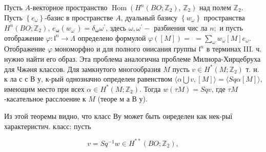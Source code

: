 \documentclass[10pt]{article}
\begin{document}
Пусть $A$-векторное пространство $\operatorname{Hom}\left(H^{n}\left(B O ; \mathbb{Z}_{2}\right)\right.$, $\left.\mathbb{Z}_{2}\right)$ над полем $\mathbb{Z}_{2}$. Пусть $\left\{e_{\omega}\right\}$-базис в пространстве $A$, дуальный базису $\left\{w_{\omega}\right\}$ пространства $H^{n}\left(B O ; \mathbb{Z}_{2}\right)$, $e_{\boldsymbol{\omega}}\left(w_{\omega^{\prime}}\right)=\delta_{\boldsymbol{\omega}} \omega^{\prime}$, здесь $\omega, \omega^{\prime}-$ разбиения чис ла $n ;$ и пусть отображение $\varphi: \mathfrak{l}^{n} \longrightarrow \Lambda$ определено формулой $\varphi([M])=$ $=\sum_{\omega} w_{\omega}[M] e_{\omega}$. Отображение $\varphi$ мономорфно и для полного оиисания группы $\mathfrak{l}^{n}$ в терминах III. ч. нужно найти его образ. Эта проблема аналогична проблеме Милнора-Хирцебруха для Чжәня классов. Для замкнутого многообразия $M$ пусть $v \in H^{*}\left(M ; \mathbb{Z}_{2}\right)$ т. н. к ла с с В у, к-рый однозначно определен равенством $\langle\alpha \bigcup v,[M]\rangle=\langle S q \alpha[M]\rangle$, имеющим место при всех $\alpha \in H^{*}\left(M ; \mathbb{Z}_{2}\right)$. Тогда $w(\tau M)=S q v$, где $\tau M$-касательное расслоение к $M$ (теоре м а В у).



Из этой теоремы видно, что класс Ву может быть оиределен как нек-рыї характеристич. класс: пусть



\[

v=S q^{-1} w \in H^{* *}\left(B O ; \mathbb{Z}_{2}\right),

\]
\end{document}
